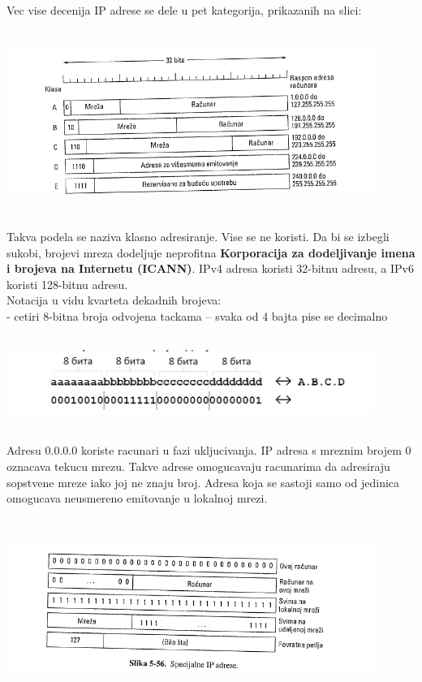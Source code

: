 \documentclass{article} %
\begin{document}
Vec vise decenija IP adrese se dele u pet kategorija, prikazanih na slici:
 \begin{center}
\includegraphics[width=12cm, height=6cm]{klasnoAdr}\\
\end{center}
 Takva podela se naziva klasno adresiranje. Vise se ne koristi. Da bi se izbegli sukobi, brojevi mreza dodeljuje neprofitna \textbf{Korporacija za dodeljivanje imena i brojeva na Internetu (ICANN)}.
IPv4 adresa koristi 32-bitnu adresu, a  IPv6 koristi 128-bitnu adresu.\\

Notacija u vidu kvarteta dekadnih brojeva:\\
 - cetiri 8-bitna broja odvojena tackama – svaka od 4 bajta pise se decimalno 
 \begin{center}
\includegraphics[width=12cm, height=3cm]{IPadresa}\\
\end{center}
Adresu 0.0.0.0 koriste racunari u fazi ukljucivanja. IP adresa s mreznim brojem 0 oznacava tekucu mrezu. Takve adrese omogucavaju racunarima da adresiraju sopstvene mreze iako joj ne znaju broj. Adresa koja se sastoji samo od jedinica omogucava neusmereno emitovanje u lokalnoj mrezi.
 \begin{center}
\includegraphics[width=12cm, height=6cm]{specijalneIP}\\
\end{center}
\end{document}
